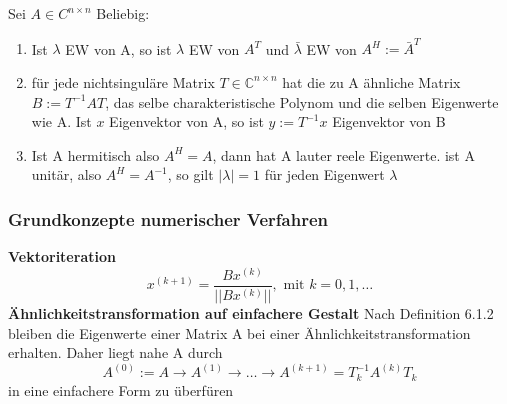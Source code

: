 \documentclass[
	ngerman,
	accentcolor=9c,%
	type=intern,
	marginpar=false
	]{tudapub}
\begin{document}
                \begin{definition}
                    Sei $A \in C^{n \times n}$ Beliebig:
                    \begin{enumerate}[label=\alph*)]
                        \item Ist $\lambda$ EW von A, so ist $\lambda$ EW von $A^T$ und $\bar\lambda$ EW von $A^H := \bar{A}^T$
                        \item für jede nichtsinguläre Matrix $T \in \mathbb{C}^{n \times n}$ hat die zu A ähnliche Matrix $B:= T^{-1}AT$,
                        das selbe charakteristische Polynom und die selben Eigenwerte wie A. Ist $x$ Eigenvektor von A,
                        so ist $y:= T^{-1}x$ Eigenvektor von B
                        \item Ist A hermitisch also $A^H = A$, dann hat A lauter reele Eigenwerte. ist A unitär, also
                        $A^H = A^{-1}$, so gilt $|\lambda|=1$ für jeden Eigenwert $\lambda$
                    \end{enumerate}
                \end{definition}
            \subsubsection{Grundkonzepte numerischer Verfahren}
                \textbf{Vektoriteration}
                \begin{equation*}
                    x^{(k+1)} = \dfrac{Bx^{(k)}}{||Bx^{(k)}||}, \mbox{ mit } k=0,1,\dots
                \end{equation*}
                \textbf{Ähnlichkeitstransformation auf einfachere Gestalt}
                Nach Definition 6.1.2 bleiben die Eigenwerte einer Matrix A bei einer Ähnlichkeitstransformation erhalten.
                Daher liegt nahe A durch
                \begin{equation*}
                    A^{(0)}:= A \rightarrow A^{(1)} \rightarrow \dots \rightarrow A^{(k+1)} = T_k^{-1}A^{(k)}T_k
                \end{equation*}
                in eine einfachere Form zu überfüren
\end{document}
